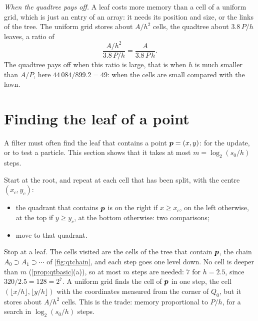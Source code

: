 \emph{When the quadtree pays off.} A leaf costs more memory than a cell
of a uniform grid, which is just an entry of an array: it needs its
position and size, or the links of the tree. The uniform grid stores
about $A/h^2$ cells, the quadtree about $3.8\,P/h$ leaves, a ratio of
\[
  \frac{A/h^2}{3.8\,P/h}=\frac{A}{3.8\,P\,h}.
\]
The quadtree pays off when this ratio is large, that is when $h$ is much
smaller than $A/P$, here $44\,084/899.2=49$: when the cells are small
compared with the lawn.

\section{Finding the leaf of a point}
\label{sec:qt-find}

A filter must often find the leaf that contains a point $\bm{p}=(x,y)$: for
the update, or to test a particle. This section shows that it takes at
most $m=\log_2(s_0/h)$ steps.

Start at the root, and repeat at each cell that has been split, with the
centre $(x_c,y_c)$:
\begin{itemize}[nosep]
  \item the quadrant that contains $\bm{p}$ is on the right if $x\ge x_c$, on
        the left otherwise, at the top if $y\ge y_c$, at the bottom
        otherwise: two comparisons;
  \item move to that quadrant.
\end{itemize}
Stop at a leaf. The cells visited are the cells of the tree that contain
$\bm{p}$, the chain $A_0\supset A_1\supset\cdots$ of \cref{fig:qtchain}, and
each step goes one level down. No cell is deeper than $m$
(\cref{prop:qtbasic}(a)), so at most $m$ steps are needed: $7$ for
$h=2.5$, since $320/2.5=128=2^7$. A uniform grid finds the cell of $\bm{p}$
in one step, the cell $(\lfloor x/h\rfloor,\lfloor y/h\rfloor)$ with the
coordinates measured from the corner of $Q_0$, but it stores about
$A/h^2$ cells. This is the trade: memory proportional to $P/h$, for a
search in $\log_2(s_0/h)$ steps.

